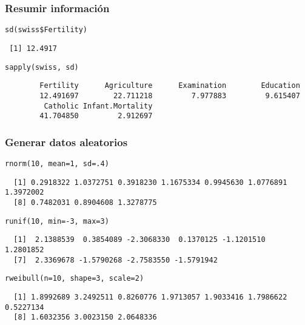 \documentclass{beamer}
\begin{document}
\begin{frame}[fragile]
\frametitle{Resumir información}
\label{sec-2-2}



\lstset{language=R}
\begin{lstlisting}
sd(swiss$Fertility)
\end{lstlisting}

\begin{verbatim}
 [1] 12.4917
\end{verbatim}


\lstset{language=R}
\begin{lstlisting}
sapply(swiss, sd)
\end{lstlisting}

\begin{verbatim}
        Fertility      Agriculture      Examination        Education 
        12.491697        22.711218         7.977883         9.615407 
         Catholic Infant.Mortality 
        41.704850         2.912697
\end{verbatim}
\end{frame}
\begin{frame}[fragile]
\frametitle{Generar datos aleatorios}
\label{sec-2-3}



\lstset{language=R}
\begin{lstlisting}
rnorm(10, mean=1, sd=.4)
\end{lstlisting}

\begin{verbatim}
  [1] 0.2918322 1.0372751 0.3918230 1.1675334 0.9945630 1.0776891 1.3972002
  [8] 0.7482031 0.8904608 1.3278775
\end{verbatim}


\lstset{language=R}
\begin{lstlisting}
runif(10, min=-3, max=3)
\end{lstlisting}

\begin{verbatim}
  [1]  2.1388539  0.3854089 -2.3068330  0.1370125 -1.1201510  1.2801852
  [7]  2.3369678 -1.5790268 -2.7583550 -1.5791942
\end{verbatim}


\lstset{language=R}
\begin{lstlisting}
rweibull(n=10, shape=3, scale=2)
\end{lstlisting}

\begin{verbatim}
  [1] 1.8992689 3.2492511 0.8260776 1.9713057 1.9033416 1.7986622 0.5227134
  [8] 1.6032356 3.0023150 2.0648336
\end{verbatim}
\end{frame}
\end{document}
